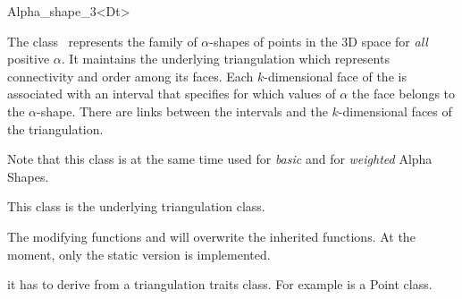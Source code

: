 \begin{ccRefClass} {Alpha_shape_3<Dt>}

\ccDefinition

The class \ccClassTemplateName\ represents the family of
$\alpha$-shapes of points in the 3D space for {\em all} positive
$\alpha$. It maintains the underlying triangulation  which
represents connectivity and order among its faces. Each
$k$-dimensional face of the  is associated with
an interval that specifies for which values of $\alpha$ the face
belongs to the $\alpha$-shape. There are links between the intervals
and the $k$-dimensional faces of the triangulation.

Note that this class is at the same time used for {\em basic} and
for {\em weighted} Alpha Shapes.

\ccInheritsFrom


This class is the underlying triangulation class.

The modifying functions  and  will overwrite
the inherited functions. At the moment, only the static version is implemented.

\ccTypes
{}
\ccThreeToTwo

it has to derive from a triangulation traits class.  
For example  is a Point class. 






\end{ccRefClass}
